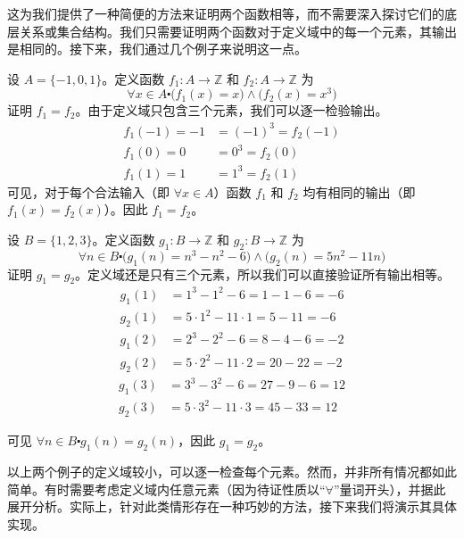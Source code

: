 这为我们提供了一种简便的方法来证明两个函数相等，而不需要深入探讨它们的底层关系或集合结构。我们只需要证明两个函数对于定义域中的每一个元素，其输出是相同的。接下来，我们通过几个例子来说明这一点。

\begin{example}
    设 $A = \{-1, 0, 1\}$。定义函数 $f_1 : A \to \mathbb{Z}$ 和 $f_2 : A \to \mathbb{Z}$ 为
    \[\forall x \in A \centerdot \big(f_1(x) = x\big) \land \big(f_2(x) = x^3\big)\]
    证明 $f_1 = f_2$。由于定义域只包含三个元素，我们可以逐一检验输出。
    \begin{align*}
        f_1(-1) = -1 &= (-1)^3 = f_2(-1)\\
        f_1(0) = 0 &= 0^3 = f_2(0)\\
        f_1(1) = 1 &= 1^3 = f_2(1)
    \end{align*}
    可见，对于每个合法输入（即 $\forall x \in A$）函数 $f_1$ 和 $f_2$ 均有相同的输出（即 $f_1(x) = f_2(x)$）。因此 $f_1 = f_2$。
\end{example}

\begin{example}
    设 $B = \{1, 2, 3\}$。定义函数 $g_1 : B \to \mathbb{Z}$ 和 $g_2 : B \to \mathbb{Z}$ 为
    \[\forall n \in B \centerdot \big(g_1(n) = n^3-n^2-6\big) \land \big(g_2(n) = 5n^2-11n\big)\]
    证明 $g_1 = g_2$。定义域还是只有三个元素，所以我们可以直接验证所有输出相等。
    \begin{align*}
        g_1(1) &= 1^3 - 1^2 - 6 = 1 - 1 - 6 = -6 \\
        g_2(1) &= 5 \cdot 1^2 - 11 \cdot 1 = 5 - 11 = -6 
   \end{align*}
   \begin{align*}
        g_1(2) &= 2^3 - 2^2 - 6 = 8 - 4 - 6 = -2 \\
        g_2(2) &= 5 \cdot 2^2 - 11 \cdot 2 = 20 - 22 = -2
   \end{align*}
   \begin{align*}
        g_1(3) &= 3^3 - 3^2 - 6 = 27 - 9 - 6 = 12 \\
        g_2(3) &= 5 \cdot 3^2 - 11 \cdot 3 = 45 - 33 = 12
    \end{align*}

    可见 $\forall n \in B \centerdot g_1(n) = g_2(n)$，因此 $g_1 = g_2$。
\end{example}

以上两个例子的定义域较小，可以逐一检查每个元素。然而，并非所有情况都如此简单。有时需要考虑定义域内任意元素（因为待证性质以``$\forall$''量词开头），并据此展开分析。实际上，针对此类情形存在一种巧妙的方法，接下来我们将演示其具体实现。

